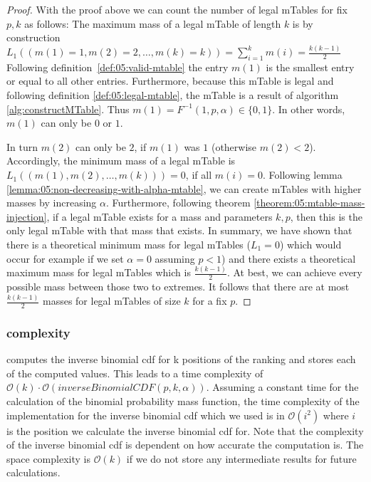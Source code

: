 \begin{proof}
	\label{proof:05:number-of-mtables}
	With the proof above we can count the number of legal mTables for fix $p,k$ as follows: The maximum mass of a legal mTable of length $k$ is by construction
	$L_1 ((m(1) = 1,m(2) = 2, \ldots, m(k) = k)) = \sum_{i=1}^k m(i) = \frac{k(k-1)}{2}$
	Following definition~\ref{def:05:valid-mtable} the 	    entry $m(1)$ is the smallest entry or equal to all other entries. Furthermore, because this mTable is legal and following definition \ref{def:05:legal-mtable}, the mTable is a result of algorithm \ref{alg:constructMTable}. Thus $m(1) = F^{-1}(1,p,\alpha) \in \lbrace 0,1\rbrace$. In other words, $m(1)$ can only be $0$ or $1$.
	
	In turn $m(2)$ can only be $2$, if $m(1)$ was $1$ (otherwise $m(2)<2$).
	Accordingly, the minimum mass of a legal mTable is $L_1((m(1),m(2), \ldots, m(k))) = 0$, if all $m(i)=0$.
	Following lemma \ref{lemma:05:non-decreasing-with-alpha-mtable}, we can create mTables with higher masses by increasing $\alpha$. Furthermore, following theorem \ref{theorem:05:mtable-mass-injection}, if a legal mTable exists for a mass and parameters $k,p$, then this is the only legal mTable with that mass that exists. In summary, we have shown that there is a theoretical minimum mass for legal mTables ($L_1 =0$) which would occur for example if we set $\alpha = 0$ assuming $p<1$) and there exists a theoretical maximum mass for legal mTables which is $\frac{k(k-1)}{2}$. At best, we can achieve every possible mass between those two to extremes. 
	It follows that there are at most $\frac{k(k-1)}{2}$ masses for legal mTables of size $k$ for a fix $p$.
\end{proof}

\subsubsection{\algoMtable complexity}\label{subsubsec:construct-mtable-complexity}
\algoMtable computes the inverse binomial cdf for k positions of the ranking and stores each of the computed values.
%
This leads to a time complexity of $\mathcal{O}(k) \cdot \mathcal{O}(inverseBinomialCDF(p,k,\alpha))$.  Assuming a constant time for the calculation of the binomial probability mass function, the time complexity of the implementation for the inverse binomial cdf which we used is in $\mathcal{O}(i^2)$ where $i$ is the position we calculate the inverse binomial cdf for.
%
Note that the complexity of the inverse binomial cdf is dependent on how accurate the computation is.
%
The space complexity is $\mathcal{O}(k)$ if we do not store any intermediate results for future calculations.
%

